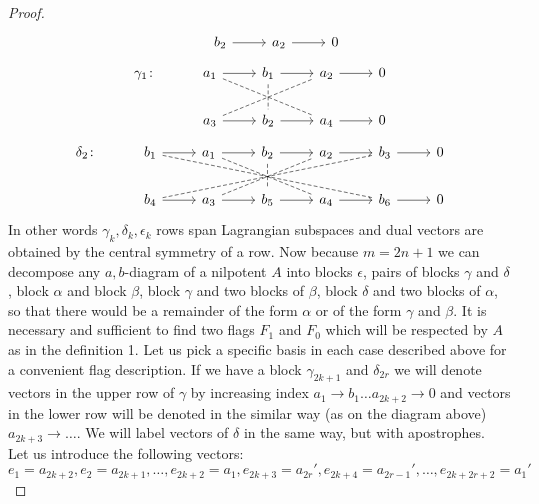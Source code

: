 \documentclass[12pt]{amsart}
\theoremstyle{definition}
\theoremstyle{remark}
\numberwithin{equation}{subsection}
\begin{document}
\begin{proof}
\begin{equation}
\begin{tikzcd}
            & b_2 \arrow[r]                             & a_2 \arrow[r]                             & 0
\end{tikzcd}
\end{equation}
\begin{equation}
    \begin{tikzcd}
\gamma_1\colon  & a_1 \arrow[r] \arrow[rrd, no head, dashed] & b_1 \arrow[r] \arrow[d, no head, dashed] & a_2 \arrow[r] & 0 \\
          & a_3 \arrow[r] \arrow[rru, no head, dashed] & b_2 \arrow[r]                            & a_4 \arrow[r] & 0
\end{tikzcd}
\end{equation}
\begin{equation}
\begin{tikzcd}
\delta_2\colon  & b_1 \arrow[r] \arrow[rrrrd, no head, dashed] & a_1 \arrow[r] \arrow[rrd, no head, dashed] & b_2 \arrow[r] \arrow[d, no head, dashed] & a_2 \arrow[r] & b_3 \arrow[r] & 0 \\
          & b_4 \arrow[r] \arrow[rrrru, no head, dashed] & a_3 \arrow[r] \arrow[rru, no head, dashed] & b_5 \arrow[r]                            & a_4 \arrow[r] & b_6 \arrow[r] & 0
\end{tikzcd}
\end{equation}
In other words $\gamma_k,\delta_k,\epsilon_k$ rows span Lagrangian subspaces and dual vectors are obtained by the central symmetry of a row. Now because $m=2n+1$ we can decompose any $a,b$-diagram of a nilpotent $A$ into blocks $\epsilon$, pairs of blocks $\gamma$ and $\delta$, block $\alpha$ and block $\beta$, block $\gamma$ and two blocks of $\beta$, block $\delta$ and two blocks of $\alpha$, so that there would be a remainder of the form $\alpha$ or of the form $\gamma$ and $\beta$. It is necessary and sufficient to find two flags $F_1$ and $F_0$ which will be respected by $A$ as in the definition 1. Let us pick a specific basis in each case described above for a convenient flag description. If we have a block $\gamma_{2k+1}$ and $\delta_{2r}$ we will denote vectors in the upper row of $\gamma$ by increasing index $a_1 \rightarrow b_1 \dots  a_{2k+2}\rightarrow 0$ and vectors in the lower row will be denoted in the similar way (as on the diagram above) $a_{2k+3}\rightarrow \dots$. We will label vectors of $\delta$ in the same way, but with apostrophes.\\
Let us introduce the following vectors:
\begin{equation}
    e_{1} = a_{2k+2},e_{2}=a_{2k+1},\dots,e_{2k+2}=a_1, e_{2k+3}= a_{2r}',e_{2k+4}= a_{2r-1}',\dots,e_{2k+2r+2}= a_{1}' 

\end{equation}
\end{proof}
\end{document}
